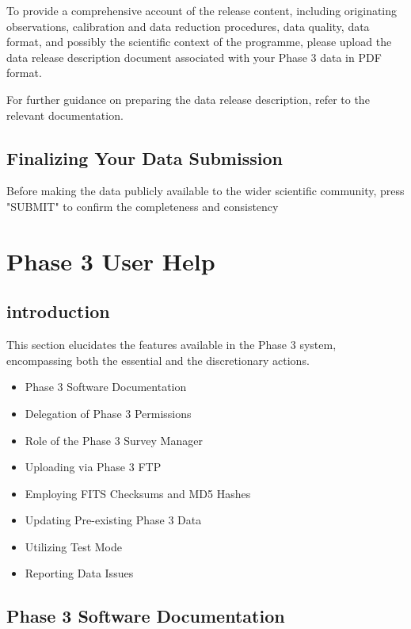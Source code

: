 \documentclass[a4paper,10pt]{book}
\begin{document}
To provide a comprehensive account of the release content, including originating observations, calibration and data reduction procedures, data quality, data format, and possibly the scientific context of the programme, please upload the data release description document associated with your Phase 3 data in PDF format.

For further guidance on preparing the data release description, refer to the relevant documentation.

\section{Finalizing Your Data Submission}

Before making the data publicly available to the wider scientific community, press "SUBMIT" to confirm the completeness and consistency






\chapter{Phase 3 User Help}

\section{introduction}

This section elucidates the features available in the Phase 3 system, encompassing both the essential and the discretionary actions.

\begin{itemize}
    \item Phase 3 Software Documentation
    \item Delegation of Phase 3 Permissions
    \item Role of the Phase 3 Survey Manager
    \item Uploading via Phase 3 FTP
    \item Employing FITS Checksums and MD5 Hashes
    \item Updating Pre-existing Phase 3 Data
    \item Utilizing Test Mode
    \item Reporting Data Issues
\end{itemize}

\section{Phase 3 Software Documentation}
\end{document}
